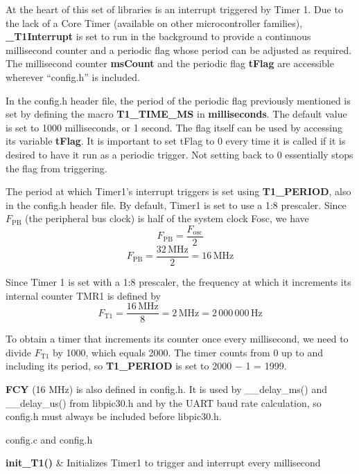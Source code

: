 \documentclass[
  11pt,
  letterpaper,
  oneside,
  DIV=13,               %
  parskip=half,          %
  headings=normal,
  chapterprefix=false,
  toc=listof,
  numbers=noenddot,
]{scrbook}
\newenvironment{functiontable}[1]
  {\par\smallskip\noindent\small\tabularx{\linewidth}{#1}}
  {\endtabularx\par\medskip}
\begin{document}
At the heart of this set of libraries is an interrupt triggered by Timer 1. Due to the lack of a Core Timer (available on other microcontroller families), \textbf{\_T1Interrupt }is set to run in the background to provide a continuous millisecond counter and a periodic flag whose period can be adjusted as required. The millisecond counter \textbf{msCount }and the periodic flag \textbf{tFlag} are accessible wherever ``config.h'' is included.

In the config.h header file, the period of the periodic flag previously mentioned is set by defining the macro \textbf{T1\_TIME\_MS} in \textbf{milliseconds}. The default value is set to 1000 milliseconds, or 1 second. The flag itself can be used by accessing its variable \textbf{tFlag}. It is important to set tFlag to 0 every time it is called if it is desired to have it run as a periodic trigger. Not setting back to 0 essentially stops the flag from triggering.

The period at which Timer1's interrupt triggers is set using \textbf{T1\_PERIOD}, also in the config.h header file. By default, Timer1 is set to use a 1:8 prescaler. Since $F_{\mathrm{PB}}$ (the peripheral bus clock) is half of the system clock Fosc, we have
\[ F_{\mathrm{PB}} = \frac{F_{\mathrm{osc}}}{2} \]
\[ F_{\mathrm{PB}} = \frac{32\,\mathrm{MHz}}{2} = 16\,\mathrm{MHz} \]

Since Timer 1 is set with a 1:8 prescaler, the frequency at which it increments its internal counter TMR1 is defined by
\[ F_{\mathrm{T1}} = \frac{16\,\mathrm{MHz}}{8} = 2\,\mathrm{MHz} = 2\,000\,000\,\mathrm{Hz} \]

To obtain a timer that increments its counter once every millisecond, we need to divide $F_{\mathrm{T1}}$ by 1000, which equals 2000. The timer counts from 0 up to and including its period, so \textbf{T1\_PERIOD }is set to 2000 $-$ 1 = 1999.

\textbf{FCY} (16 MHz) is also defined in config.h. It is used by \_\_delay\_ms() and \_\_delay\_us() from libpic30.h and by the UART baud rate calculation, so config.h must always be included before libpic30.h.

config.c and config.h
\begin{functiontable}{>{\raggedright\arraybackslash}p{0.36\linewidth}>{\raggedright\arraybackslash}X}
\toprule
\textbf{init\_T1()} & Initializes Timer1 to trigger and interrupt every millisecond \\
\bottomrule
\end{functiontable}
\end{document}
